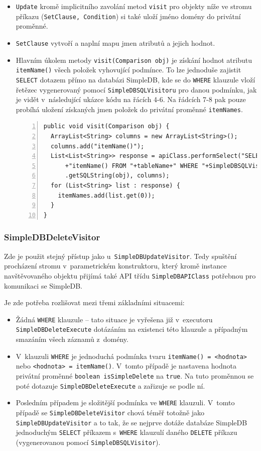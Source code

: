 \documentclass[oneside,12pt]{fithesis2}
\begin{document}
\begin{itemize}
 \item \texttt{Update} kromě implicitního zavolání metod \texttt{visit} pro objekty níže ve stromu příkazu (\texttt{SetClause, Condition}) si také uloží jméno domény do privátní proměnné.
 \item \texttt{SetClause} vytvoří a naplní mapu jmen atributů a jejich hodnot.
 \item Hlavním úkolem metody \texttt{visit(Comparison obj)} je získání hodnot atributu \texttt{itemName()} všech položek vyhovující podmínce. To lze jednoduše zajistit \texttt{SELECT} dotazem přímo na databázi SimpleDB, kde se do \texttt{WHERE} klauzule vloží řetězec vygenerovaný pomocí \texttt{SimpleDBSQLVisitoru} pro danou podmínku, jak je vidět v~následující ukázce kódu na řácích 4-6. Na řádcích 7-8 pak pouze probíhá uložení získaných jmen položek do privátní proměnné \texttt{itemNames}.
 \begin{Verbatim}[fontsize=\small,numbers=left]
public void visit(Comparison obj) {
  ArrayList<String> columns = new ArrayList<String>();
  columns.add("itemName()");
  List<List<String>> response = apiClass.performSelect("SELECT "
      +"itemName() FROM "+tableName+" WHERE "+SimpleDBSQLVisitor
      .getSQLString(obj), columns);
  for (List<String> list : response) {
    itemNames.add(list.get(0));
  }
}
 \end{Verbatim}
\end{itemize}

\subsubsection*{SimpleDBDeleteVisitor}
Zde je použit stejný přístup jako u~\texttt{SimpleDBUpdateVisitor}. Tedy spuštění procházení stromu v~parametrickém konstruktoru, který kromě instance navštěvovaného objektu přijímá také API třídu \texttt{SimpleDBAPIClass} potřebnou pro komunikaci se SimpleDB.

Je zde potřeba rozlišovat mezi třemi základními situacemi:
\begin{itemize}
 \item Žádná \texttt{WHERE} klauzule -- tato situace je vyřešena již v~executoru \texttt{SimpleDBDeleteExecute} dotázáním na existenci této klauzule a případným smazáním všech záznamů z~domény.
 \item V~klauzuli \texttt{WHERE} je jednoduchá podmínka tvaru \texttt{itemName() = <hodnota>} nebo \texttt{<hodnota> = itemName()}. V~tomto případě je nastavena hodnota privátní proměnné \texttt{boolean isSimpleDelete} na \texttt{true}. Na tuto proměnnou se poté dotazuje \texttt{SimpleDBDelete\allowbreak Execute} a zařizuje se podle ní.
 \item Posledním případem je složitější podmínka ve \texttt{WHERE} klauzuli. V~tomto případě se \texttt{SimpleDBDeleteVisitor} chová téměř totožně jako \texttt{SimpleDBUpdateVisitor} a to tak, že se nejprve dotáže databáze SimpleDB jednoduchým \texttt{SELECT} příkazem s~\texttt{WHERE} klauzulí daného \texttt{DELETE} příkazu (vygenerovanou pomocí \texttt{SimpleDBSQL\allowbreak Visitor}).
\end{itemize}
\end{document}
